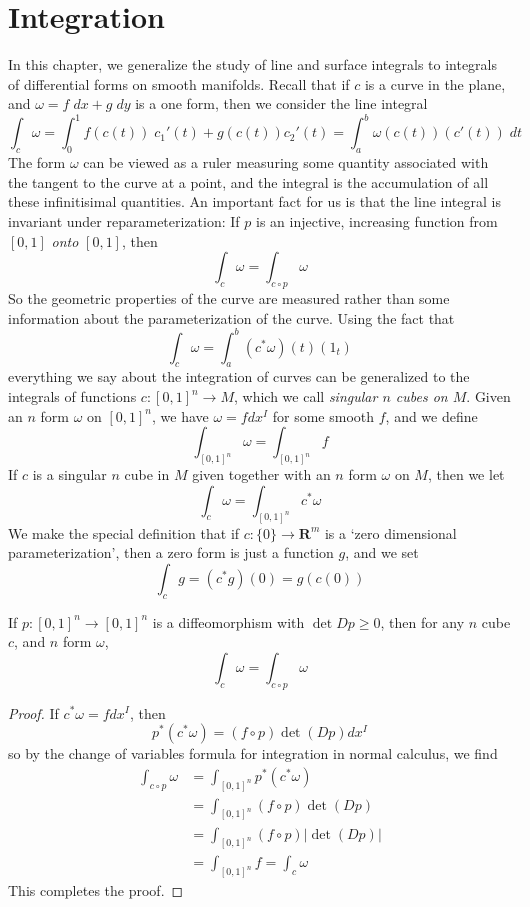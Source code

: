 \chapter{Integration}

In this chapter, we generalize the study of line and surface integrals to integrals of differential forms on smooth manifolds. Recall that if $c$ is a curve in the plane, and $\omega = f\; dx + g\; dy$ is a one form, then we consider the line integral
%
\[ \int_c \omega = \int_0^1 f(c(t))\; c_1'(t) + g(c(t)) c_2'(t) = \int_a^b \omega(c(t))(c'(t))\; dt \]
%
The form $\omega$ can be viewed as a ruler measuring some quantity associated with the tangent to the curve at a point, and the integral is the accumulation of all these infinitisimal quantities. An important fact for us is that the line integral is invariant under reparameterization: If $p$ is an injective, increasing function from $[0,1]$ {\it onto} $[0,1]$, then
%
\[ \int_c \omega = \int_{c \circ p} \omega \]
%
So the geometric properties of the curve are measured rather than some information about the parameterization of the curve. Using the fact that
%
\[ \int_c \omega = \int_a^b (c^* \omega)(t)(1_t) \]
%
everything we say about the integration of curves can be generalized to the integrals of functions $c: [0,1]^n \to M$, which we call \emph{singular $n$ cubes on $M$}. Given an $n$ form $\omega$ on $[0,1]^n$, we have $\omega = f dx^I$ for some smooth $f$, and we define
%
\[ \int_{[0,1]^n} \omega = \int_{[0,1]^n} f \]
%
If $c$ is a singular $n$ cube in $M$ given together with an $n$ form $\omega$ on $M$, then we let
%
\[ \int_c \omega = \int_{[0,1]^n} c^* \omega \]
%
We make the special definition that if $c: \{ 0 \} \to \mathbf{R}^m$ is a `zero dimensional parameterization', then a zero form is just a function $g$, and we set
%
\[ \int_c g = (c^* g)(0) = g(c(0)) \]
%

\begin{theorem}
    If $p: [0,1]^n \to [0,1]^n$ is a diffeomorphism with $\det Dp \geq 0$, then for any $n$ cube $c$, and $n$ form $\omega$,
    \[ \int_c \omega = \int_{c \circ p} \omega \]
\end{theorem}
\begin{proof}
    If $c^* \omega = f dx^I$, then
    \[ p^*(c^* \omega) = (f \circ p) \det(Dp) dx^I \] 
    so by the change of variables formula for integration in normal calculus, we find
    \begin{align*}
        \int_{c \circ p} \omega &= \int_{[0,1]^n} p^*(c^* \omega)\\
        &= \int_{[0,1]^n} (f \circ p) \det(Dp)\\
        &= \int_{[0,1]^n} (f \circ p) |\det(Dp)|\\
        &= \int_{[0,1]^n} f = \int_c \omega
    \end{align*}
    This completes the proof.
\end{proof}

